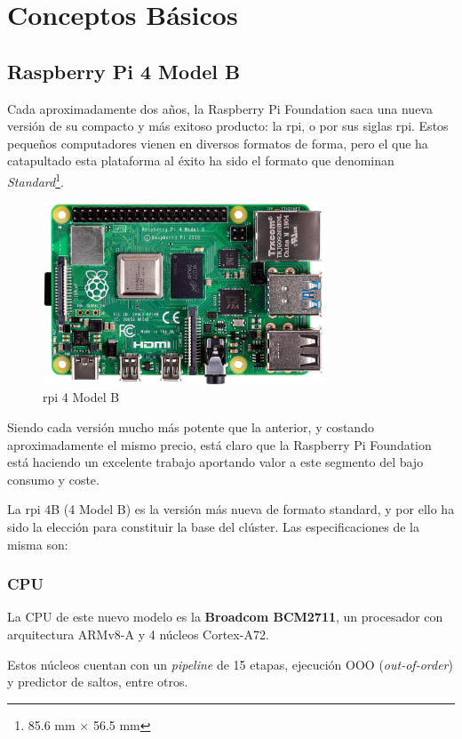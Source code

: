 \section{Conceptos Básicos}
\subsection{Raspberry Pi 4 Model B}
Cada aproximadamente dos años, la Raspberry Pi Foundation saca una nueva versión de su compacto y más exitoso producto: la \acrlong{rpi}, o por sus siglas \acrshort{rpi}. Estos pequeños computadores vienen en diversos formatos de forma, pero el que ha catapultado esta plataforma al éxito ha sido el formato que denominan \textit{Standard}\footnote{85.6 mm × 56.5 mm}.

\begin{figure}[h!]
  \centering
  \includegraphics[width=0.75\textwidth]{img/rpi_parts/rpi_base.jpg}
  \caption{\acrlong{rpi} 4 Model B}
  \label{fig:rpi_base}
\end{figure}

Siendo cada versión mucho más potente que la anterior, y costando aproximadamente el mismo precio, está claro que la Raspberry Pi Foundation está haciendo un excelente trabajo aportando valor a este segmento del bajo consumo y coste.

La \acrlong{rpi} 4B (4 Model B) es la versión más nueva de formato standard, y por ello ha sido la elección para constituir la base del clúster. Las especificaciones de la misma son:

\subsubsection{CPU}
La CPU de este nuevo modelo es la \textbf{Broadcom BCM2711}, un procesador con arquitectura ARMv8-A y 4 núcleos Cortex-A72.

Estos núcleos cuentan con un \textit{pipeline} de 15 etapas, ejecución OOO (\textit{out-of-order}) y predictor de saltos, entre otros.

